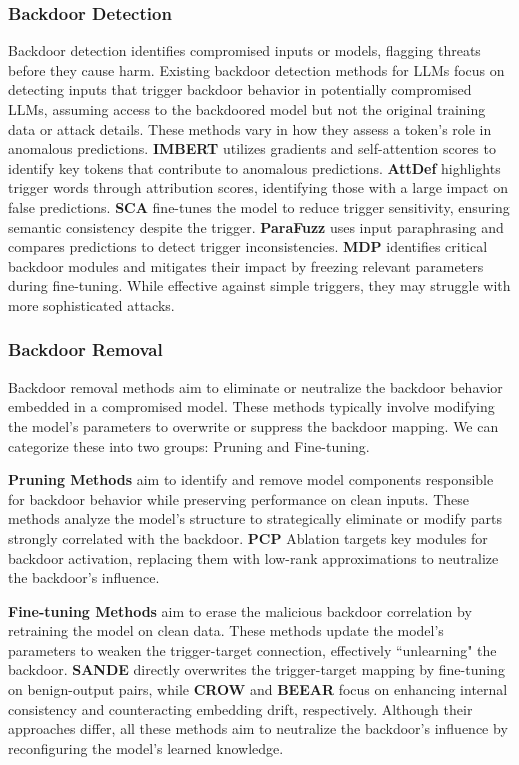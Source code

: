 \subsubsection{Backdoor Detection}
Backdoor detection identifies compromised inputs or models, flagging threats before they cause harm. Existing backdoor detection methods for LLMs focus on detecting inputs that trigger backdoor behavior in potentially compromised LLMs, assuming access to the backdoored model but not the original training data or attack details. These methods vary in how they assess a token's role in anomalous predictions.
\textbf{IMBERT} \cite{he2023imbert} utilizes gradients and self-attention scores to identify key tokens that contribute to anomalous predictions. 
\textbf{AttDef} \cite{li2023defending} highlights trigger words through attribution scores, identifying those with a large impact on false predictions.
\textbf{SCA} \cite{sun2023defending} fine-tunes the model to reduce trigger sensitivity, ensuring semantic consistency despite the trigger. 
\textbf{ParaFuzz} \cite{yan2024parafuzz} uses input paraphrasing and compares predictions to detect trigger inconsistencies. 
\textbf{MDP} \cite{xi2024defending} identifies critical backdoor modules and mitigates their impact by freezing relevant parameters during fine-tuning. 
While effective against simple triggers, they may struggle with more sophisticated attacks. 

\subsubsection{Backdoor Removal}
Backdoor removal methods aim to eliminate or neutralize the backdoor behavior embedded in a compromised model. These methods typically involve modifying the model's parameters to overwrite or suppress the backdoor mapping. We can categorize these into two groups: Pruning and Fine-tuning.

\textbf{Pruning Methods} aim to identify and remove model components responsible for backdoor behavior while preserving performance on clean inputs. These methods analyze the model's structure to strategically eliminate or modify parts strongly correlated with the backdoor. \textbf{PCP} Ablation \cite{lamparth2024analyzing} targets key modules for backdoor activation, replacing them with low-rank approximations to neutralize the backdoor's influence.


\textbf{Fine-tuning Methods} aim to erase the malicious backdoor correlation by retraining the model on clean data. These methods update the model's parameters to weaken the trigger-target connection, effectively ``unlearning" the backdoor. \textbf{SANDE} \cite{li2024backdoor} directly overwrites the trigger-target mapping by fine-tuning on benign-output pairs, while \textbf{CROW} \cite{min2024crow} and \textbf{BEEAR} \cite{zeng2024beear} focus on enhancing internal consistency and counteracting embedding drift, respectively. Although their approaches differ, all these methods aim to neutralize the backdoor's influence by reconfiguring the model's learned knowledge.

